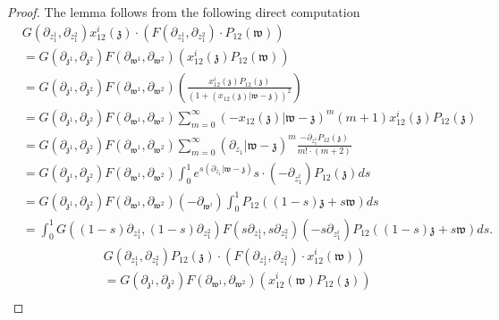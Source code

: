 \documentclass[11pt]{amsart}
\theoremstyle{definition}
\theoremstyle{remark}
\numberwithin{equation}{section}
\begin{document}
\begin{proof}
The lemma follows from the following direct computation
  \begin{align*}
&      G(\partial_{z^1_{1}},\partial_{z^2_{1}})x^i_{12}(\mathfrak{z})\cdot\left( F(\partial_{z^1_{1}},\partial_{z^2_{1}})\cdot P_{12}(\mathfrak{w})\right)  \\ &=G(\partial_{\mathfrak{z}^1},\partial_{\mathfrak{z}^2})F(\partial_{\mathfrak{w}^1},\partial_{\mathfrak{w}^2})\left(x^i_{12}(\mathfrak{z})P_{12}(\mathfrak{w})\right)\\
     & =G(\partial_{\mathfrak{z}^1},\partial_{\mathfrak{z}^2})F(\partial_{\mathfrak{w}^1},\partial_{\mathfrak{w}^2})\left(\frac{x^i_{12}(\mathfrak{z})P_{12}(\mathfrak{z})}{\left(1+(x_{12}(\mathfrak{z})|\mathfrak{w}-\mathfrak{z})\right)^2}\right)\\
    &=  G(\partial_{\mathfrak{z}^1},\partial_{\mathfrak{z}^2})F(\partial_{\mathfrak{w}^1},\partial_{\mathfrak{w}^2})  \sum_{m=0}^{\infty}(-x_{12}(\mathfrak{z})|\mathfrak{w}-\mathfrak{z})^m(m+1)x^i_{12}(\mathfrak{z})P_{12}(\mathfrak{z}) \\
    &=G(\partial_{\mathfrak{z}^1},\partial_{\mathfrak{z}^2})F(\partial_{\mathfrak{w}^1},\partial_{\mathfrak{w}^2}) \sum_{m=0}^{\infty}(\partial_{z_1}|\mathfrak{w}-\mathfrak{z})^m\frac{-\partial_{z^1_1}P_{12}(\mathfrak{z})}{m!\cdot (m+2)}\\
    &=G(\partial_{\mathfrak{z}^1},\partial_{\mathfrak{z}^2})F(\partial_{\mathfrak{w}^1},\partial_{\mathfrak{w}^2}) \int^1_0e^{s(\partial_{z_1}|\mathfrak{w}-\mathfrak{z})}s\cdot (-\partial_{z^{i}_1})P_{12}(\mathfrak{z})ds\\
    &=G(\partial_{\mathfrak{z}^1},\partial_{\mathfrak{z}^2})F(\partial_{\mathfrak{w}^1},\partial_{\mathfrak{w}^2})(-\partial_{\mathfrak{w}^i})\int^1_0P_{12}\left((1-s)\mathfrak{z}+s\mathfrak{w}\right)ds\\
    &=\int^1_0G\left((1-s)\partial_{z^1_1},(1-s)\partial_{z^2_1}\right)F\left(s\partial_{z^1_1},s\partial_{z^2_1}\right)(-s\partial_{z^i_1})P_{12}\left((1-s)\mathfrak{z}+s\mathfrak{w}\right)ds.
  \end{align*}
\iffalse
  \begin{align*}
     & G(\partial_{z^1_{1}},\partial_{z^2_{1}})P_{12}(\mathfrak{z})\cdot\left( F(\partial_{z^1_{1}},\partial_{z^2_{1}})\cdot x^i_{12}(\mathfrak{w})\right)  \\ &=G(\partial_{\mathfrak{z}^1},\partial_{\mathfrak{z}^2})F(\partial_{\mathfrak{w}^1},\partial_{\mathfrak{w}^2})\left(x^i_{12}(\mathfrak{w})P_{12}(\mathfrak{z})\right)\\

\end{align*}
\end{proof}
\end{document}
